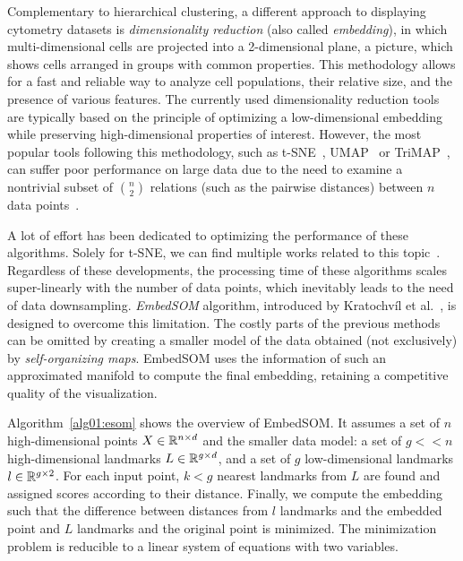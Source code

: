 Complementary to hierarchical clustering, a different approach to displaying cytometry datasets is \emph{dimensionality reduction} (also called \emph{embedding}), in which multi-dimensional cells are projected into a 2-dimensional plane, a picture, which shows cells arranged in groups with common properties. This methodology allows for a fast and reliable way to analyze cell populations, their relative size, and the presence of various features. The currently used dimensionality reduction tools are typically based on the principle of optimizing a low-dimensional embedding while preserving high-dimensional properties of interest. However, the most popular tools following this methodology, such as t-SNE~\cite{maaten2008visualizing}, UMAP~\cite{becht2019dimensionality} or TriMAP~\cite{amid2019trimap}, can suffer poor performance on large data due to the need to examine a nontrivial subset of $\binom{n}{2}$ relations (such as the pairwise distances) between $n$ data points~\cite{kratochvil2019generalized}.

A lot of effort has been dedicated to optimizing the performance of these algorithms. Solely for t-SNE, we can find multiple works related to this topic~\cite{pezzotti2016hierarchical,pezzotti2016approximated,linderman2017efficient,belkina2018automated}. Regardless of these developments, the processing time of these algorithms scales super-linearly with the number of data points, which inevitably leads to the need of data downsampling. \emph{EmbedSOM} algorithm, introduced by Kratochvíl et al.~\cite{kratochvil2019generalized}, is designed to overcome this limitation. The costly parts of the previous methods can be omitted by creating a smaller model of the data obtained (not exclusively) by \emph{self-organizing maps}. EmbedSOM uses the information of such an approximated manifold to compute the final embedding, retaining a competitive quality of the visualization. 

Algorithm~\ref{alg01:esom} shows the overview of EmbedSOM. It assumes a set of $n$ high-dimensional points $X \in \mathbb{R}^{n \times d}$ and the smaller data model: a set of $g << n$ high-dimensional landmarks $L \in \mathbb{R}^{g \times d}$, and a set of $g$ low-dimensional landmarks $l \in \mathbb{R}^{g \times 2}$. For each input point, $k < g$ nearest landmarks from $L$ are found and assigned scores according to their distance. Finally, we compute the embedding such that the difference between distances from $l$ landmarks and the embedded point and $L$ landmarks and the original point is minimized. The minimization problem is reducible to a linear system of equations with two variables.

